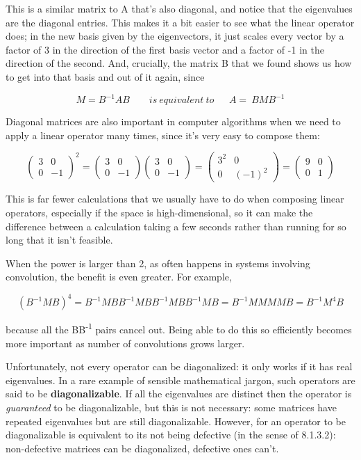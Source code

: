 \documentclass[oneside,english]{amsbook}
\numberwithin{section}{chapter}
\theoremstyle{plain}
\theoremstyle{definition}
\begin{document}
This is a similar matrix to A that's also diagonal, and notice that the
eigenvalues are the diagonal entries. This makes it a bit easier to see
what the linear operator does; in the new basis given by the
eigenvectors, it just scales every vector by a factor of 3 in the
direction of the first basis vector and a factor of -1 in the direction
of the second. And, crucially, the matrix B that we found shows us how
to get into that basis and out of it again, since

\[M = B^{- 1}AB\ \ \ \ \ \ \ \ \ is\ equivalent\ to\ \ \ \ \ \ \ A = \ {BMB}^{- 1}\]

Diagonal matrices are also important in computer algorithms when we need
to apply a linear operator many times, since it's very easy to compose
them:

\[\begin{pmatrix}
	3 & 0 \\
	0 & - 1
\end{pmatrix}^{2} = \begin{pmatrix}
	3 & 0 \\
	0 & - 1
\end{pmatrix}\begin{pmatrix}
	3 & 0 \\
	0 & - 1
\end{pmatrix} = \begin{pmatrix}
	3^{2} & 0 \\
	0 & {( - 1)}^{2}
\end{pmatrix} = \begin{pmatrix}
	9 & 0 \\
	0 & 1
\end{pmatrix}\]

This is far fewer calculations that we usually have to do when composing
linear operators, especially if the space is high-dimensional, so it can
make the difference between a calculation taking a few seconds rather
than running for so long that it isn't feasible.

When the power is larger than 2, as often happens in systems involving
convolution, the benefit is even greater. For example,

\[\left( B^{- 1}MB \right)^{4} = B^{- 1}MBB^{- 1}MBB^{- 1}MBB^{- 1}MB = B^{- 1}MMMMB = B^{- 1}M^{4}B\]

because all the BB\textsuperscript{-1} pairs cancel out. Being able to
do this so efficiently becomes more important as number of convolutions
grows larger.

Unfortunately, not every operator can be diagonalized: it only works if
it has real eigenvalues. In a rare example of sensible mathematical
jargon, such operators are said to be \textbf{diagonalizable}. If all
the eigenvalues are distinct then the operator is \emph{guaranteed} to
be diagonalizable, but this is not necessary: some matrices have
repeated eigenvalues but are still diagonalizable. However, for an
operator to be diagonalizable is equivalent to its not being defective
(in the sense of 8.1.3.2): non-defective matrices can be diagonalized,
defective ones can't.
\end{document}
